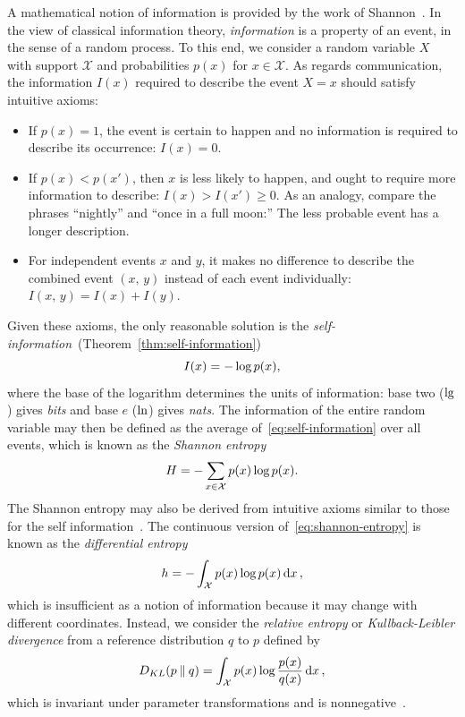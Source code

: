 \documentclass[aps,reprint,floatfix]{revtex4-2}
\renewcommand\mathrm\textnormal%
\theoremstyle{plain}
\theoremstyle{definition}
\renewcommand\geq\geqslant%
\renewcommand\ln{\operatorname{\mathrm{ln}}}
\renewcommand\lg{\operatorname{\mathrm{lg}}}
\renewcommand\log{\operatorname{\mathrm{log}}}
\begin{document}
A mathematical notion of information is provided by the work of
Shannon~\cite{shannon1948mathematical}. In the view of classical information
theory, \emph{information} is a property of an event, in the sense of a random
process. To this end, we consider a random variable $X$ with support
$\mathcal{X}$ and probabilities $p(x)$ for $x \in \mathcal{X}$. As regards
communication, the information $I(x)$ required to describe the event $X = x$
should satisfy intuitive axioms:
\begin{itemize}
  \item If $p(x) = 1$, the event is certain to happen and no information is
    required to describe its occurrence: $I(x) = 0$.
  \item If $p(x) < p(x')$, then $x$ is less likely to happen, and ought to
    require more information to describe: $I(x) > I(x') \geq 0$. As an analogy,
    compare the phrases ``nightly'' and ``once in a full moon:'' The less
    probable event has a longer description.
  \item For independent events $x$ and $y$, it makes no difference to describe
    the combined event $(x,\, y)$ instead of each event individually: $I(x,\, y)
    = I(x) + I(y)$.
\end{itemize}

Given these axioms, the only reasonable solution is the
\emph{self-information}~(Theorem~\ref{thm:self-information})
\begin{equation}
  I(x)
  = -\log p(x),
  \label{eq:self-information}
\end{equation}
where the base of the logarithm determines the units of information: base two
($\lg$) gives \emph{bits} and base $e$ ($\ln$) gives \emph{nats}. The
information of the entire random variable may then be defined as the average
of~\eqref{eq:self-information} over all events, which is known as the
\emph{Shannon entropy}
\begin{equation}
  H
  = -\sum_{x \in \mathcal{X}} p(x) \log p(x).
  \label{eq:shannon-entropy}
\end{equation}
The Shannon entropy may also be derived from intuitive axioms similar to those
for the self information~\cite{shannon1948mathematical,jaynes1957information}.
The continuous version of~\eqref{eq:shannon-entropy} is known as the
\emph{differential entropy}
\begin{equation}
  h
  = -\int_{\mathcal{X}} p(x) \log p(x) \dd{x},
  \label{eq:differential-entropy}
\end{equation}
which is insufficient as a notion of information because it may change with
different coordinates. Instead, we consider the \emph{relative entropy} or
\emph{Kullback-Leibler divergence} from a reference distribution $q$ to $p$
defined by
\begin{equation}
  D_{KL}(p \mathbin{\|} q)
  = \int_{\mathcal{X}} p(x) \log \frac{p(x)}{q(x)} \dd{x},
  \label{eq:kl-divergence}
\end{equation}
which is invariant under parameter transformations and
is nonnegative~\cite[p.~243]{cover}.
\end{document}
